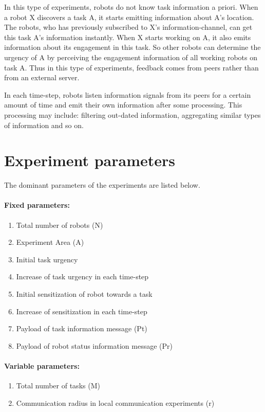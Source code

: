 \documentclass[11pt,a4paper]{report}
\begin{document}
In this type of experiments, robots do not know task information a priori. When a robot X discovers a task A, it starts emitting information about A's location. The robots, who has previously subscribed to X's information-channel, can get this task A's information instantly. When X starts working on A, it also emits information about its engagement in this task. So other robots can determine the urgency of A by perceiving the engagement information of all working robots on task A. Thus in this type of experiments, feedback comes from peers rather than from an external server.

 In each time-step, robots listen information signals from its peers for a certain amount of time and emit their own information after some processing. This processing may include: filtering out-dated information, aggregating similar types of information and so on.
%
\section{Experiment parameters}
The dominant parameters of the experiments are listed below.
\paragraph{Fixed parameters:}
\begin{enumerate}
\item Total number of robots (N)
\item Experiment Area (A)
\item Initial task urgency
\item Increase of task urgency in each time-step
\item Initial sensitization of robot towards a task
\item Increase of sensitization in each time-step
\item Payload of task information message (Pt)
\item Payload of robot status information message (Pr)
\end{enumerate}
\paragraph{Variable parameters:}
\begin{enumerate}
\item Total number of tasks (M)
\item Communication radius in local communication experiments (r)
\end{enumerate}
%
\end{document}
